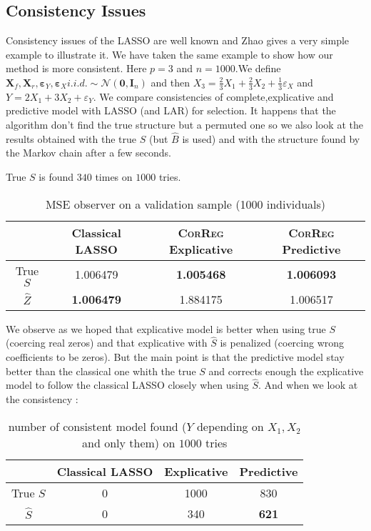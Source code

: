 \documentclass[11pt,a4paper]{report}
\begin{document}
		\subsection{Consistency Issues}\label{consistency}
		Consistency issues of the LASSO are well known and Zhao \cite{Zhao2006MSC} gives a very simple example to illustrate it.
		We have taken the same example to show how our method is more consistent.
		Here $p=3$ and $n=1000$.We define $\boldsymbol{X}_f,\boldsymbol{X}_r,\boldsymbol{\varepsilon}_Y,\boldsymbol{\varepsilon}_{X} i.i.d. \sim \mathcal{N}(\boldsymbol{0},\boldsymbol{I}_n)$ and then $X_3=\frac{2}{3}X_1+\frac{2}{3}X_2+\frac{1}{3}\varepsilon_X$ and $Y=2X_1+3X_2+\varepsilon_Y$.
		We compare consistencies of complete,explicative and predictive model with LASSO (and LAR) for selection.
		It happens that the algorithm don't find the true structure but a permuted one so we also look at the results obtained with the true $S$ (but $\hat{B}$ is used) and with the structure found by the Markov chain after a few seconds.
		
		True $S$ is found $340$ times on $1000$ tries.
		
		\begin{table}[h!]
		\centering
		\begin{tabular}{|c|c|c|c|}
		\hline 
		 & Classical LASSO & \textsc{CorReg} Explicative & \textsc{CorReg} Predictive \\ 
		\hline 
		True $S$ &  1.006479 & \textbf{1.005468} & \textbf{1.006093} \\ 
		\hline 
		$\hat{Z}$ & \textbf{1.006479} & 1.884175 & 1.006517 \\ 
		\hline 
		\end{tabular} 
		\caption{MSE observer on a validation sample (1000 individuals)}
		\end{table}

		We observe as we hoped that explicative model is better when using true $S$ (coercing real zeros) and that explicative with $\hat{S}$ is penalized (coercing wrong coefficients to be zeros).
		But the main point is that the predictive model stay better than the classical one whith the true $S$ and corrects enough the explicative model to follow the classical LASSO closely when using $\hat{S}$. 
		And when we look at the consistency :
		\begin{table}[h!]	
		\centering
		\begin{tabular}{|c|c|c|c|}
		\hline 
		 & Classical LASSO & Explicative & Predictive \\ 
		\hline 
		True $S$ &  0 & 1000 & 830 \\ 
		\hline 
		$\hat{S}$ & 0 & 340 & \textbf{621} \\ 
		\hline 
		\end{tabular} 
		\caption{number of consistent model found ($Y$ depending on $X_1,X_2$ and only them) on $1000$ tries}
		\end{table}				
		
\end{document}
